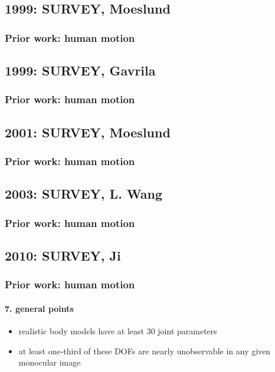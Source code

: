 \subsection{1999: SURVEY, Moeslund}
\begin{frame}
\frametitle{Prior work: human motion}
\framesubtitle{}
\mypagenum
{}
\end{frame}



\subsection{1999: SURVEY, Gavrila}
\begin{frame}
\frametitle{Prior work: human motion}
\framesubtitle{}
\mypagenum
{}
\end{frame}


\subsection{2001: SURVEY, Moeslund}
\begin{frame}
\frametitle{Prior work: human motion}
\framesubtitle{}
\mypagenum
{}
\end{frame}


\subsection{2003: SURVEY, L. Wang}
\begin{frame}
\frametitle{Prior work: human motion}
\framesubtitle{}
\mypagenum
{}
\end{frame}


\subsection{2010: SURVEY, Ji}
\begin{frame}
\frametitle{Prior work: human motion}
\framesubtitle{7. general points}
\mypagenum
{}
	\begin{itemize}
		\item realistic body models have at least 30 joint parameters
		\item at least one-third of these DOFs are nearly unobservable in any given monocular image
	\end{itemize}
\end{frame}


\printbibliography


